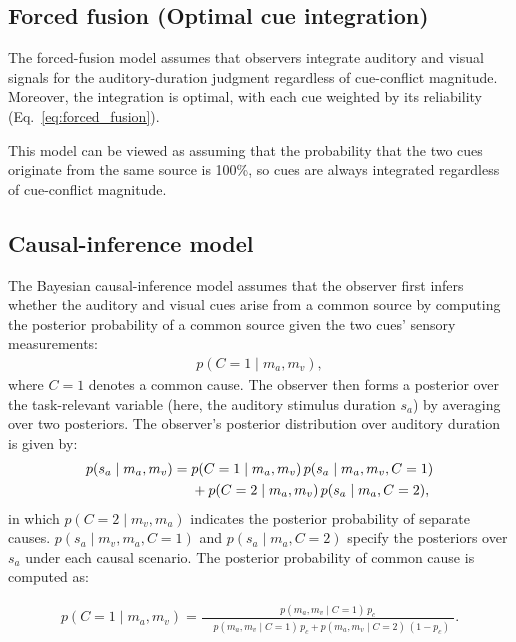 \documentclass{jov}
\begin{document}
\subsection{Forced fusion (Optimal cue integration)}
The forced-fusion model assumes that observers integrate auditory and visual signals for the auditory-duration judgment regardless of cue-conflict magnitude. Moreover, the integration is optimal, with each cue weighted by its reliability (Eq.~\ref{eq:forced_fusion}). 

This model can be viewed as assuming that the probability that the two cues originate from the same source is 100\%, so cues are always integrated regardless of cue-conflict magnitude. 

\subsection{Causal-inference model}
The Bayesian causal-inference model assumes that the observer first infers whether the auditory and visual cues arise from a common source by computing the posterior probability of a common source given the two cues' sensory measurements:
\begin{align}
p(C = 1 \mid m_a, m_v),
\label{eq:pc}
\end{align}
where $C = 1$ denotes a common cause. The observer then forms a posterior over the task-relevant variable (here, the auditory stimulus duration $s_a$) by averaging over two posteriors. The observer's posterior distribution over auditory duration is given by:
\begin{align}
p(s_a \mid m_a, m_v)
= {}& p(C = 1 \mid m_a, m_v)\,
      p(s_a \mid m_a, m_v,C=1) \notag\\
&+ p(C = 2 \mid m_a, m_v)\,
   p(s_a \mid m_a,C=2),
\label{eq:auditory_bimodal_estimate}
\end{align}
in which $p(C = 2 \mid m_v, m_a)$ indicates the posterior probability of separate causes. $p(s_a \mid m_v, m_a, C=1)$ and $p(s_a \mid m_a,C=2)$ specify the posteriors over $s_a$ under each causal scenario. The posterior probability of common cause is computed as:

\begin{equation}
\begin{split}
p(C=1 \mid m_a, m_v)
=
\frac{
p(m_a, m_v \mid C=1)\, p_c
}{
\begin{aligned}
&p(m_a, m_v \mid C=1)\, p_c + p(m_a, m_v \mid C=2)\, (1 - p_c)
\end{aligned}
}.
\end{split}
\label{eq:posterior_common_cause}
\end{equation}
\end{document}
